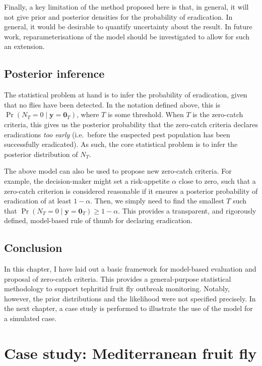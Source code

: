 \documentclass[
  oneside]{book}
\begin{document}
Finally, a key limitation of the method proposed here is that, in general, it will not give prior and posterior densities for the probability of eradication. In general, it would be desirable to quantify uncertainty about the result. In future work, reparameterisations of the model should be investigated to allow for such an extension.

\hypertarget{posterior-inference}{%
\section{Posterior inference}\label{posterior-inference}}

The statistical problem at hand is to infer the probability of eradication, given that no flies have been detected. In the notation defined above, this is \(\Pr(N_T = 0 \mid \mathbf y = \mathbf 0_T)\), where \(T\) is some threshold. When \(T\) is the zero-catch criteria, this gives us the posterior probability that the zero-catch criteria declares eradications \emph{too early} (i.e.~before the suspected pest population has been successfully eradicated). As such, the core statistical problem is to infer the posterior distribution of \(N_T\).

The above model can also be used to propose new zero-catch criteria. For example, the decision-maker might set a risk-appetite \(\alpha\) close to zero, such that a zero-catch criterion is considered reasonable if it ensures a posterior probability of eradication of at least \(1-\alpha\). Then, we simply need to find the smallest \(T\) such that \(\Pr(N_T = 0 \mid \mathbf y = \mathbf 0_T) \geq 1-\alpha\). This provides a transparent, and rigorously defined, model-based rule of thumb for declaring eradication.

\hypertarget{conclusion-1}{%
\section{Conclusion}\label{conclusion-1}}

In this chapter, I have laid out a basic framework for model-based evaluation and proposal of zero-catch criteria. This provides a general-purpose statistical methodology to support tephritid fruit fly outbreak monitoring. Notably, however, the prior distributions and the likelihood were not specified precisely. In the next chapter, a case study is performed to illustrate the use of the model for a simulated case.

\hypertarget{case-study-mediterranean-fruit-fly}{%
\chapter{Case study: Mediterranean fruit fly}\label{case-study-mediterranean-fruit-fly}}
\end{document}
